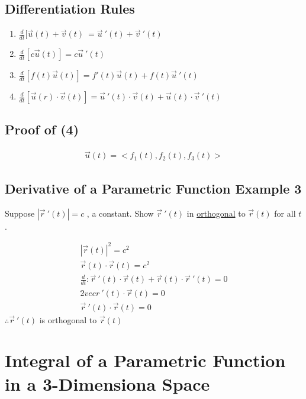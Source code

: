 \documentclass[12pt]{article}
\begin{document}
\subsection{Differentiation Rules}
\begin{enumerate}
	\item \(\frac{d}{dt}[\vec{u} (t)  +\vec{v} (t)\ = \vec{u} \ '(t) + \vec{v}\ '(t)   \) 
	\item \(\frac{d}{dt}[c \vec{u} (t)] = c \vec{u} \ '(t)  \) 
	\item \(\frac{d}{dt}[f(t) \vec{u}(t)] = f'(t)\vec{u} (t) + f(t)\vec{u} \ '(t)    \) 
	\item \(\frac{d}{dt}[\vec{u} (r)\cdot \vec{v} (t)] = \vec{u} \ '(t)\cdot \vec{v} (t)+ \vec{u} (t) \cdot \vec{v} \ '(t)       \) 
\end{enumerate}

\subsection{Proof of (4)}
\begin{align}
	\vec{u} (t)	= <f_1(t),f_2(t),f_3(t)> 
\end{align}
\subsection{Derivative of a Parametric Function Example 3}
Suppose \(|\vec{r} \ '(t)| = c\) , a constant. Show \(\vec{r} \ '(t) \) in \underline{orthogonal} to \(\vec{r} (t) \) for all \(t\).

\begin{align}
	|\vec{r} (t)|^2 = c^2\\%
	\vec{r} (t)	\cdot \vec{r} (t) = c^2\\%
	\frac{d}{dt}: \vec{r} \ '(t) \cdot \vec{r} (t) + \vec{r} (t) \cdot \vec{r} \ '(t) = 0   \\%
	2vec	r	\ '(t) \cdot \vec{r} (t) = 0\\%
	\vec{r} \ '(t) \cdot \vec{r} (t) = 0
\end{align}
\(\therefore \vec{r} \ '(t) \) is orthogonal to \(\vec{r} (t) \) 

\section{Integral of a Parametric Function in a 3-Dimensiona Space}
\end{document}
